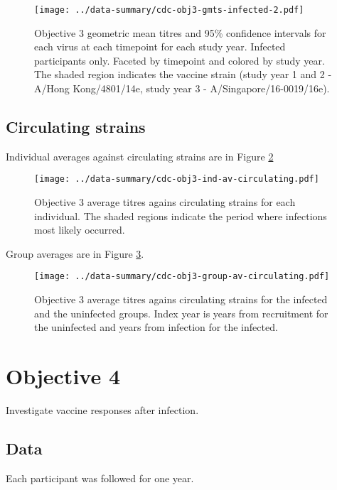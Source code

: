 \documentclass[12pt]{article}
\begin{document}
\begin{figure}
	\texttt{[image: ../data-summary/cdc-obj3-gmts-infected-2.pdf]}
	\caption{Objective 3 geometric mean titres and 95\% confidence intervals for each virus at each timepoint for each study year. Infected participants only. Faceted by timepoint and colored by study year. The shaded region indicates the vaccine strain (study year 1 and 2 - A/Hong Kong/4801/14e, study year 3 - A/Singapore/16-0019/16e).}
	\label{fig:cdc-obj3-gmts-infected-2}
\end{figure}

\subsection{Circulating strains}

Individual averages against circulating strains are in Figure \ref{fig:cdc-obj3-ind-av-circulating}

\begin{figure}
	\centering
	\texttt{[image: ../data-summary/cdc-obj3-ind-av-circulating.pdf]}
	\caption{Objective 3 average titres agains circulating strains for each individual. The shaded regions indicate the period where infections most likely occurred.}
	\label{fig:cdc-obj3-ind-av-circulating}
\end{figure}

Group averages are in Figure \ref{fig:cdc-obj3-group-av-circulating}.

\begin{figure}
	\centering
	\texttt{[image: ../data-summary/cdc-obj3-group-av-circulating.pdf]}
	\caption{Objective 3 average titres agains circulating strains for the infected and the uninfected groups. Index year is years from recruitment for the uninfected and years from infection for the infected.}
	\label{fig:cdc-obj3-group-av-circulating}
\end{figure}

\section{Objective 4}

Investigate vaccine responses after infection.

\subsection{Data}

Each participant was followed for one year.
\end{document}
